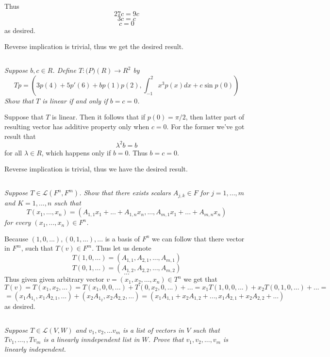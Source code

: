 \documentclass[11pt,oneside,titlepage]{book}
\begin{document}
Thus
$$27c = 9c$$
$$3c = c$$
$$c = 0$$
as desired.

Reverse implication is trivial, thus we get the desired result.

\subsection{}
\textit{Suppose $b, c \in R$. Define $T: \mathcal(P)(R) \to R^2$ by}
$$Tp = \left(3p(4) + 5p'(6) + bp(1)p(2), \int_{-1}^2{x^3 p(x) dx} + c \sin{p(0)}\right)$$
\textit{Show that $T$ is linear if and only if $b = c = 0$.}

Suppose that $T$ is linear. Then it follows that if $p(0) = \pi/2$, then latter
part of resulting vector has additive property only when $c = 0$. For the former
we've got result that
$$\lambda^2 b = b$$
for all $\lambda \in R$, which happens only if $b = 0$. Thus $b = c = 0$.

Reverse implication is trivial, thus we have the desired result.

\subsection{}
\textit{Suppose $T \in  \mathcal{L}(F^n, F^m)$. Show that there exists scalars
  $A_{j, k} \in F$ for $j = 1, ..., m$ and $K = 1, ..., n$ such that}
$$T(x_1, ..., x_n) = (A_{1, 1}x_1 + ... + A_{1, n} x_n, ..., A_{m, 1} x_1 + ... + A_{m, n} x_n)$$
\textit{for every $(x_1, ..., x_n) \in F^n$.}

Because $(1, 0, ...), (0, 1, ...), ... $ is a basis of $F^n$ we can follow that
there vector in $F^m$, such that $T(v) \in F^m$. Thus let us denote 
$$T(1, 0, ...) = (A_{1, 1}, A_{2, 1}, ..., A_{m, 1})$$
$$T(0, 1, ...) = (A_{1, 2}, A_{2, 2}, ..., A_{m, 2})$$
$$...$$
Thus given given arbitrary vector $v = (x_1, x_2, ..., x_n)\in T^n$ we get that 
$$T(v) = T(x_1, x_2, ...) = T(x_1, 0, 0, ...) + T(0, x_2, 0, ...) + ... =
x_1T(1, 0, 0, ...) + x_2 T(0, 1, 0, ...) + ... = $$
$$ = (x_1 A_{1_1}, x_1 A_{2, 1}, ... ) +
(x_2 A_{1_2}, x_2 A_{2, 2}, ... ) = (x_1 A_{1, 1} + x_2 A_{1, 2} + ..., x_1 A_{2, 1} + x_2 A_{2, 2} + ... )$$
as desired.

\subsection{}
\textit{Suppose $T \in \mathcal{L}(V, W)$ and $v_1, v_2, ... v_m$ is a list of vectors in $V$
  such that $T v_1, ...,, T v_m$ is a linearly inndependent list in $W$. Prove that
$v_1, v_2, ..., v_m$ is linearly independent.}
\end{document}
